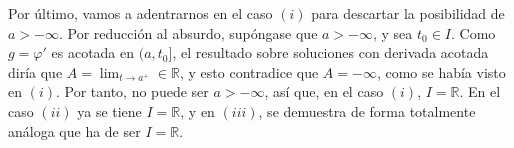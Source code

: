 \documentclass[11pt]{report}
\newcommand{\R}{\mathbb R}
\begin{document}
Por último, vamos a adentrarnos en el caso $(i)$ para descartar la posibilidad de $a>-\infty$. Por reducción al absurdo, supóngase que $a>-\infty$, y sea $t_0 \in I$. Como $g=\varphi'$ es acotada en $(a,t_0]$, el resultado sobre soluciones con derivada acotada diría que $A = \lim_{t \to a^+} \in \R$, y esto contradice que $A=-\infty$, como se había visto en $(i)$. Por tanto, no puede ser $a>-\infty$, así que, en el caso $(i)$, $I=\R$. En el caso $(ii)$ ya se tiene $I=\R$, y en $(iii)$, se demuestra de forma totalmente análoga que ha de ser $I=\R$.
\end{document}
